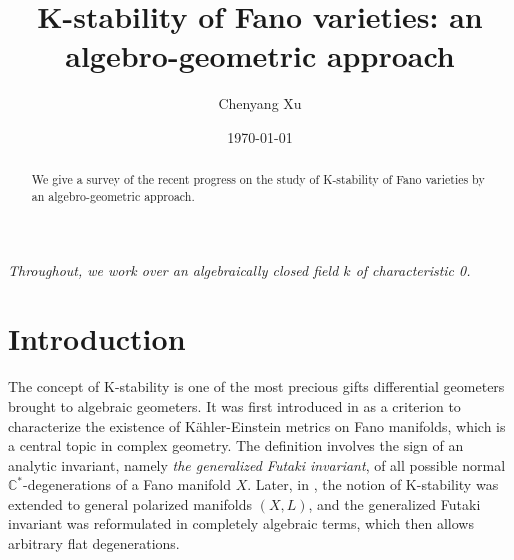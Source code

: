 \documentclass[12pt,reqno]{amsart}%
\theoremstyle{definition}
\theoremstyle{remark}
\begin{document}
\title{K-stability of Fano varieties: an algebro-geometric approach}
\date{\today}



\author {Chenyang Xu}


\address   { Current address: Princeton University, Princeton NJ 08544, USA}

\address   { MIT, Cambridge, MA 02139, USA}

\address   { BICMR, Beijing 100871, China}
%

%


\begin{abstract}{
We give a survey of the recent progress on the study of K-stability of Fano varieties by an algebro-geometric approach.}
\end{abstract}

\maketitle{}
\setcounter{tocdepth}{2}
\tableofcontents

{\let\thefootnote\relax{}
\marginpar{}
}



\emph{Throughout, we work over an algebraically closed  field $k$ of characteristic 0.}


\section{Introduction}\label{s-intro}

The concept of K-stability is one of the most precious gifts differential geometers brought to algebraic geometers. It was first introduced in \cite{Tia97} as a criterion to characterize the existence of K\"ahler-Einstein metrics on Fano manifolds, which is a central topic in complex geometry. The definition involves the sign of an analytic invariant, namely {\it the generalized Futaki invariant}, of all possible normal $\mathbb{C}^*$-degenerations of a Fano manifold $X$.  Later, in \cite{Don02}, the notion of K-stability was extended to general polarized manifolds $(X,L)$, and  {the generalized Futaki invariant} was reformulated in completely algebraic terms, which then allows arbitrary flat degenerations.
\end{document}
